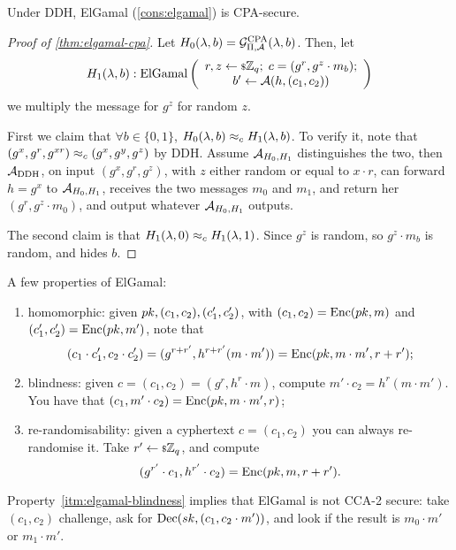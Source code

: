 \begin{theorem} \label{thm:elgamal-cpa}
	Under \ac{DDH}, ElGamal (\cref{cons:elgamal}) is \ac{CPA}-secure.
\end{theorem}

\begin{proof}[Proof of \cref{thm:elgamal-cpa}]
	Let $H_0(\lambda, b) = \mathcal{G}_{\Pi,\mathcal{A}}^{\text{CPA}}(\lambda, b)$.
	Then, let
	\begin{equation*}
		H_1(\lambda, b) :
		\mathrm{ElGamal} \left(
			\begin{array}{c}
				r,z \leftarrow {\scriptstyle \$} {\mathbb{Z}_q}; \; c = (g^r, g^z \cdot m_b); \\
				b' \leftarrow \mathcal{A}(h, (c_1, c_2))
			\end{array}
		\right)
	\end{equation*}
	\ie we multiply the message for $g^z$ for random $z$.

	First we claim that $\forall b \in \{0,1\}$, $H_0(\lambda, b) \approx_c H_1(\lambda, b)$.
	To verify it, note that $(g^x, g^r, g^{xr}) \approx_c (g^x, g^y, g^z)$ by \ac{DDH}.
	Assume $\mathcal{A}_{H_0, H_1}$ distinguishes the two, then $\mathcal{A}_{\text{DDH}}$, on input $(g^x, g^r, g^z)$, with $z$ either random or equal to $x \cdot r$, can forward $h = g^x$ to $\mathcal{A}_{H_0,H_1}$, receives the two messages $m_0$ and $m_1$, and return her $(g^r, g^z \cdot m_0)$, and output whatever $\mathcal{A}_{H_0,H_1}$ outputs.

	The second claim is that $H_1(\lambda, 0) \approx_c H_1(\lambda, 1)$.
	Since $g^z$ is random, so $g^z \cdot m_b$ is random, and hides $b$.
\end{proof}

A few properties of ElGamal:
\begin{enumerate}
	\item \label{itm:elgamal-homomorphic} homomorphic: given $pk, (c_1, c_2), (c_1', c_2')$, with $(c_1,c_2) = \mathrm{Enc}(pk, m)$ and $(c_1', c_2') = \mathrm{Enc}(pk, m')$, note that
		\begin{equation*}
			(c_1 \cdot c_1', c_2 \cdot c_2') = (g^{r+r'}, h^{r+r'} (m \cdot m')) = \mathrm{Enc}(pk, m \cdot m', r + r');
		\end{equation*}
	\item \label{itm:elgamal-blindness} blindness: given $c = (c_1, c_2) = (g^r, h^r \cdot m)$, compute $m' \cdot c_2 = h^r (m \cdot m')$.
		You have that $(c_1, m' \cdot c_2) = \mathrm{Enc}(pk, m \cdot m', r)$;
	\item re-randomisability: given a cyphertext $c = (c_1, c_2)$ you can always re-randomise it.
		Take $r' \leftarrow {\scriptstyle \$} {\mathbb{Z}_q}$, and compute
		\begin{equation*}
			(g^{r'} \cdot c_1, h^{r'} \cdot c_2) = \mathrm{Enc}(pk, m, r + r').
		\end{equation*}
\end{enumerate}
Property~\ref{itm:elgamal-blindness} implies that ElGamal is not \ac{CCA}-2 secure: take $(c_1, c_2)$ challenge, ask for $\mathrm{Dec}(sk, (c_1, c_2 \cdot m'))$, and look if the result is $m_0 \cdot m'$ or $m_1 \cdot m'$.

